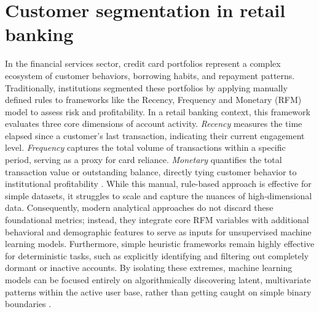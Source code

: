    \section{Customer segmentation in retail banking}
    \label{sec:banking_segmentation}
    In the financial services sector, credit card portfolios represent a complex ecosystem of customer behaviors, borrowing habits, and repayment patterns.
    Traditionally, institutions segmented these portfolios by applying manually defined rules to frameworks like the Recency, Frequency and Monetary (RFM) model to assess risk and profitability.
    In a retail banking context, this framework evaluates three core dimensions of account activity.
    \textit{Recency} measures the time elapsed since a customer's last transaction, indicating their current engagement level.
    \textit{Frequency} captures the total volume of transactions within a specific period, serving as a proxy for card reliance.
    \textit{Monetary} quantifies the total transaction value or outstanding balance, directly tying customer behavior to institutional profitability \cite{wilbert_recency_2023}.
    While this manual, rule-based approach is effective for simple datasets, it struggles to scale and capture the nuances of high-dimensional data.
    Consequently, modern analytical approaches do not discard these foundational metrics;
    instead, they integrate core RFM variables with additional behavioral and demographic features to serve as inputs for unsupervised machine learning models.
    Furthermore, simple heuristic frameworks remain highly effective for deterministic tasks, such as explicitly identifying and filtering out completely dormant or inactive accounts.
    By isolating these extremes, machine learning models can be focused entirely on algorithmically discovering latent, multivariate patterns within the active user base, rather than getting caught on simple binary boundaries \cite{yan_bank_2025}.
    
